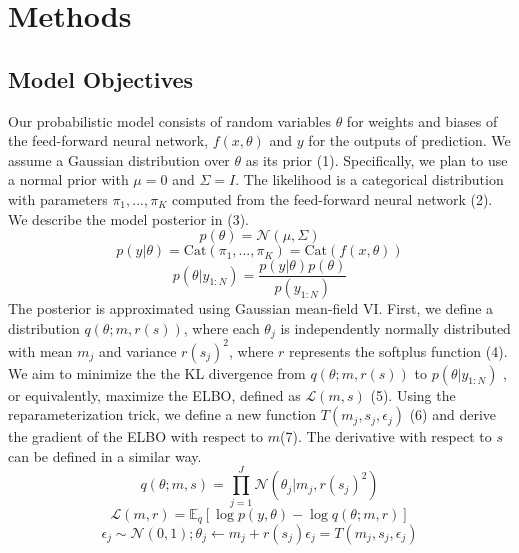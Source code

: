 \documentclass{article}
\begin{document}
\section{Methods}
\subsection{Model Objectives}
Our probabilistic model consists of random variables $\theta$ for weights and biases of the feed-forward neural network, $f(x, \theta)$ and $y$ for the outputs of prediction. We assume a Gaussian distribution over $\theta$ as its prior (1). Specifically, we plan to use a normal prior with $\mu = 0$ and $\Sigma = I$. The likelihood is a categorical distribution with parameters $\pi_1,. . .  , \pi_K$ computed from the feed-forward neural network (2). We describe the model posterior in (3).
\begin{equation}
    p(\theta) = \mathcal{N}(\mu, \Sigma)
\end{equation}
\begin{equation}
    p(y|\theta) = \text{Cat}(\pi_1,...,\pi_K) = \text{Cat}(f(x, \theta))
\end{equation}
\begin{equation}
    p(\theta|y_{1:N}) = \frac{p(y|\theta)p(\theta)}{ p(y_{1:N})} 
\end{equation}
The posterior is approximated using Gaussian mean-field VI. First, we define a distribution $q(\theta; m, r(s))$, where each $\theta_j$ is independently normally distributed with mean $m_j$  and variance $r(s_j)^2$, where $r$ represents the softplus function (4). We aim to minimize the the KL divergence from $q(\theta; m, r(s))$ to $p(\theta| y_{1:N})$ , or equivalently, maximize the ELBO, defined as $\mathcal{L} (m, s)$ (5). Using the reparameterization trick, we define a new function $T(m_j, s_j, \epsilon_j)$ (6) and derive the gradient of the ELBO with respect to $m$(7). The derivative with respect to $s$ can be defined in a similar way.
\begin{equation}
    q(\theta; m,s) = \prod_{j=1}^J \mathcal{N}(\theta_j| m_j, r(s_j)^2)
\end{equation}
\begin{equation}
    \mathcal{L}(m,r) = \mathbb{E}_q[\log{p(y, \theta)} - \log{q(\theta; m, r)}]
\end{equation}
\begin{equation}
    \epsilon_j \sim\mathcal{N}(0,1);  \theta_j \leftarrow m_j+r(s_j)\epsilon_j= T (m_j, s_j, \epsilon_j)
\end{equation}
\end{document}

